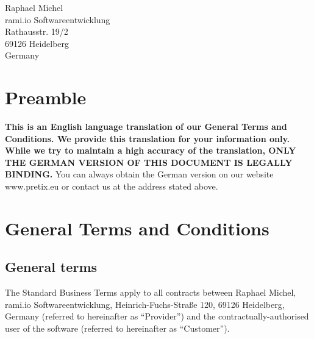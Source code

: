 \documentclass{terms}
\begin{document}
\maketitle

\begin{center}
Raphael Michel\\
rami.io Softwareentwicklung\\
Rathausstr. 19/2\\
69126 Heidelberg\\
Germany
\end{center}
\sloppy

\section*{Preamble}

\textbf{This is an English language translation of our General Terms and Conditions. We provide this translation for your information only. While we try to maintain a high accuracy of the translation, ONLY THE GERMAN VERSION OF THIS DOCUMENT IS LEGALLY BINDING.}
You can always obtain the German version on our website www.pretix.eu or contact us at the address stated above.

\section{General Terms and Conditions}
\subsection{General terms}
The Standard Business Terms apply to all contracts between Raphael Michel, rami.io Softwareentwicklung, Heinrich-Fuchs-Straße 120, 69126 Heidelberg, Germany (referred to hereinafter as “Provider”) and the contractually-authorised user of the software (referred to hereinafter as “Customer”).
\end{document}
